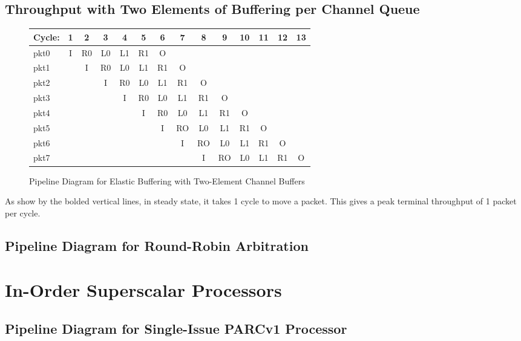 \documentclass[10pt]{article}
\begin{document}
\subsection{Throughput with Two Elements of Buffering per Channel Queue}

\begin{figure}[H]
\centering
{\setlength{\tabcolsep}{2pt}
\begin{tabular}{|l|c|c|c|c|c|c|c|c|c!{\vrule width 1.5pt}c!{\vrule width 1.5pt}c!{\vrule width 1.5pt}c!{\vrule width 1.5pt}c|}
\hline
Cycle: & 1  & 2  & 3  & 4  & 5  & 6  & 7  & 8  & 9  & 10 & 11 & 12 & 13 \\ \hline
pkt0   & I  & R0 & L0 & L1 & R1 & O  &    &    &    &    &    &    &    \\ \hline
pkt1   &    & I  & R0 & L0 & L1 & R1 & O  &    &    &    &    &    &    \\ \hline
pkt2   &    &    & I  & R0 & L0 & L1 & R1 & O  &    &    &    &    &    \\ \hline
pkt3   &    &    &    & I  & R0 & L0 & L1 & R1 & O  &    &    &    &    \\ \hline
pkt4   &    &    &    &    & I  & R0 & L0 & L1 & R1 & O  &    &    &    \\ \hline
pkt5   &    &    &    &    &    & I  & RO & L0 & L1 & R1 & O  &    &    \\ \hline
pkt6   &    &    &    &    &    &    & I  & RO & L0 & L1 & R1 & O  &    \\ \hline
pkt7   &    &    &    &    &    &    &    & I  & RO & L0 & L1 & R1 & O  \\ \hline
\end{tabular}
}
\caption{Pipeline Diagram for Elastic Buffering with Two-Element Channel Buffers}
\end{figure}
As show by the bolded vertical lines, in steady state, it takes 1 cycle to move a packet. This gives a peak terminal throughput of 1 packet per cycle.

\subsection{Pipeline Diagram for Round-Robin Arbitration}

\cleardoublepage
\section{In-Order Superscalar Processors}

\subsection{Pipeline Diagram for Single-Issue PARCv1 Processor}
\end{document}
